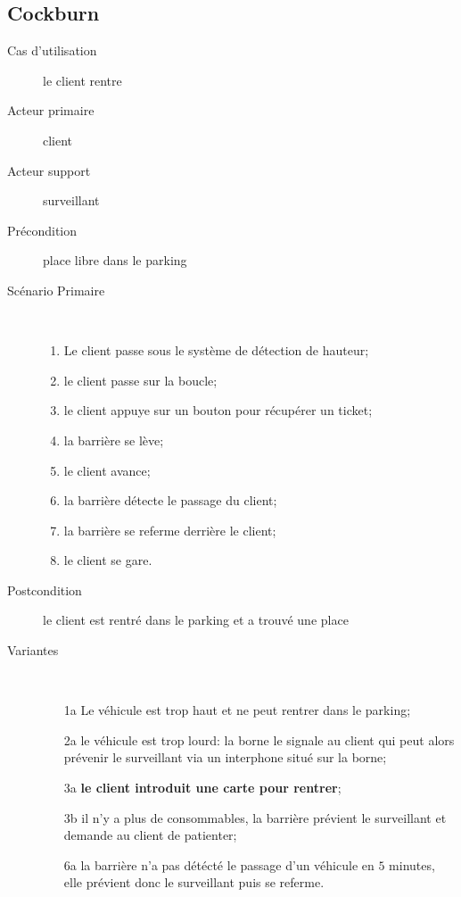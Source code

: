 \documentclass[a4paper]{article}
\begin{document}
\subsection{Cockburn}
\begin{description}
	\item[Cas d'utilisation] le client rentre
	\item[Acteur primaire] client
	\item[Acteur support] surveillant
	\item[Pr\'econdition] place libre dans le parking
	\item[Sc\'enario Primaire] \
	\begin{enumerate}
		\item Le client passe sous le syst\`eme de d\'etection de hauteur;
		\item le client passe sur la boucle;
		\item le client appuye sur un bouton pour r\'ecup\'erer un ticket;
		\item la barri\`ere se l\`eve;
		\item le client avance;
		\item la barri\`ere d\'etecte le passage du client;
		\item la barri\`ere se referme derri\`ere le client;
		\item le client se gare.
	\end{enumerate}
	\item[Postcondition] le client est rentr\'e dans le parking et a trouv\'e une place
	\item[Variantes] \
	\begin{enumerate}
		\item[1a] Le v\'ehicule est trop haut et ne peut rentrer dans
			le parking;
		\item[2a] le v\'ehicule est trop lourd: la borne le signale au client
			qui peut alors pr\'evenir le surveillant via un interphone situ\'e
			sur la borne;
		\item[3a] \textbf{le client introduit une carte pour rentrer};
		\item[3b] il n'y a plus de consommables, la barri\`ere pr\'evient
			le surveillant et demande au client de patienter;
		\item[6a] la barri\`ere n'a pas d\'et\'ect\'e le passage d'un v\'ehicule
			en $5$ minutes, elle pr\'evient donc le surveillant puis se referme.
	\end{enumerate}
\end{description}
\end{document}

